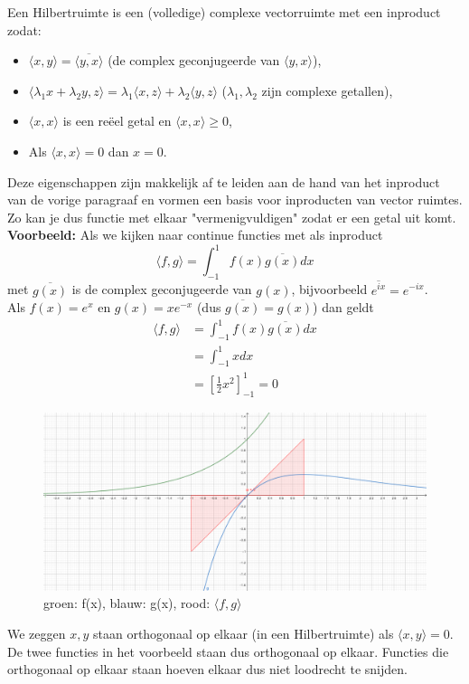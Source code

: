 \documentclass[../main.tex]{subfiles}
\begin{document}
Een Hilbertruimte is een (volledige) complexe vectorruimte met een inproduct zodat:
\begin{itemize}
    \item $\langle x,y\rangle =\overline{\langle y,x\rangle}$ (de complex geconjugeerde van $\langle y,x\rangle$),
    \item $\langle \lambda_1x+\lambda_2y,z\rangle=\lambda_1\langle x,z\rangle+\lambda_2\langle y,z\rangle$ ($\lambda_1,\lambda_2$ zijn complexe getallen),
    \item $\langle x,x\rangle$ is een reëel getal en $\langle x,x\rangle\geq 0$,
    \item Als $\langle x,x\rangle=0$ dan $x=0$.
\end{itemize}
Deze eigenschappen zijn makkelijk af te leiden aan de hand van het inproduct van de vorige paragraaf en vormen een basis voor inproducten van vector ruimtes. Zo kan je dus functie met elkaar "vermenigvuldigen" zodat er een getal uit komt.
\textbf{Voorbeeld:} Als we kijken naar continue functies met als inproduct
$$\langle f,g\rangle=\int_{-1}^1 f(x)\overline{g(x)}dx$$ met $\overline{g(x)}$ is de complex geconjugeerde van $g(x)$, bijvoorbeeld $\overline{e^{ix}}=e^{-ix}$.\\
Als $f(x)=e^x$ en $g(x)=xe^{-x}$ (dus $\overline{g(x)}=g(x)$) dan geldt \begin{align*}
    \langle f,g\rangle&=\int_{-1}^1 f(x)\overline{g(x)}dx\\
    &=\int_{-1}^1 x dx\\
    &=\left[\frac{1}{2}x^2\right]_{-1}^1=0
\end{align*}
\begin{figure}[h]
    \centering
    \includegraphics[width=.55\textwidth]{./img/inproduct functies.png}
    \caption{groen: f(x), blauw: g(x), rood: $\langle f,g\rangle$}
    \label{fig:my_label}
\end{figure}
We zeggen $x,y$ staan orthogonaal op elkaar  (in een Hilbertruimte) als $\langle x,y\rangle =0$.\\
De twee functies in het voorbeeld staan dus orthogonaal op elkaar. Functies die orthogonaal op elkaar staan hoeven elkaar dus niet loodrecht te snijden.
\end{document}

